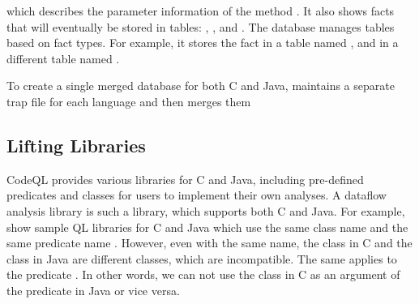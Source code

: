 \noindent
which describes the parameter information of the method .
It also shows facts that will eventually be stored in tables:
, , and
.
The database manages tables based on fact types. For example, it stores
the fact  in a table named , and
 in a different table named .

To create a single merged database for both C and Java, \ours maintains a
separate trap file for each language and then merges them 


\subsection{Lifting Libraries}

CodeQL provides various libraries for C and Java, including
pre-defined predicates and classes for users to implement their own analyses.
A dataflow analysis library is such a library, which supports both C and Java.
For example,  show sample QL libraries for C
and Java which use the same class name  and the same
predicate name .
However, even with the same name, the class  in C and the
class  in Java are different classes, which are incompatible.
The same applies to the predicate .
In other words, we can not use the class  in C as an
argument of the predicate  in Java or vice versa.

